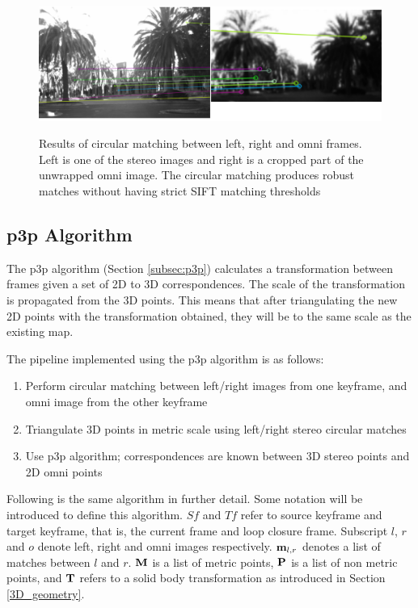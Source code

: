 \begin{figure}[h]
  \centering
    \includegraphics[width=1.0\textwidth]{chapters/images/circular_match}\\
  \caption{Results of circular matching between left, right and omni frames. Left is one of the stereo images and right is a cropped part of the unwrapped omni image. The circular matching produces robust matches without having strict SIFT matching thresholds}
  \label{fig:circular_match}
\end{figure}

\subsection{p3p Algorithm}
\label{p3p_algo}


The p3p algorithm (Section \ref{subsec:p3p}) calculates a transformation between frames given a set of 2D to 3D correspondences.  The scale of the transformation is propagated from the 3D points.  This means that after triangulating the new 2D points with the transformation obtained, they will be to the same scale as the existing map.

The pipeline implemented using the p3p algorithm is as follows:

\begin{enumerate}
\itemsep0em
 \item Perform circular matching between left/right images from one keyframe, and omni image from the other keyframe
 \item Triangulate 3D points in metric scale using left/right stereo circular matches
 \item Use p3p algorithm; correspondences are known between 3D stereo points and 2D omni points
\end{enumerate}

Following is the same algorithm in further detail.  Some notation will be introduced to define this algorithm.  $Sf$ and $Tf$ refer to source keyframe and target keyframe, that is, the current frame and loop closure frame.  Subscript $l$, $r$ and $o$ denote left, right and omni images respectively. $\mathbf {m}_{l,r}$ denotes a list of matches between $l$ and $r$.  $\mathbf M$ is a list of metric points, $\mathbf P$ is a list of non metric points, and $\mathbf T$ refers to a solid body transformation as introduced in Section \ref{3D_geometry}.

